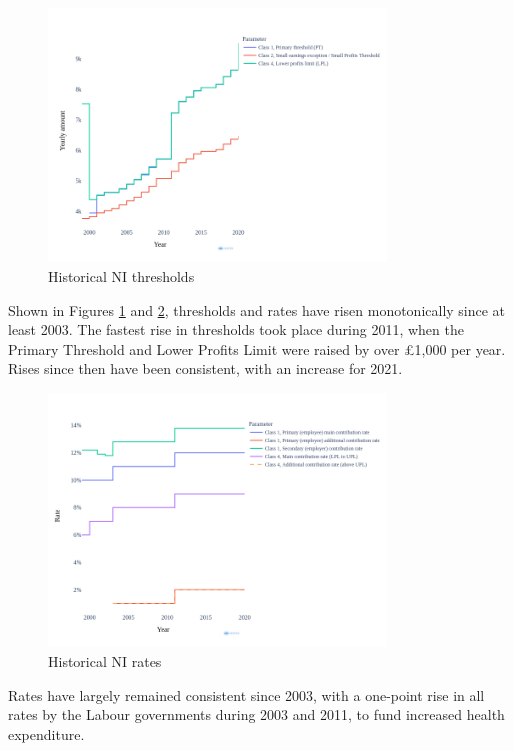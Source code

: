 \documentclass{article}
\begin{document}
    \begin{figure}
        \centering
        \includegraphics[width=0.8\textwidth]{images/fig_6.png}
        \caption{Historical NI thresholds}
        \label{fig:NI_thresholds}
    \end{figure}

    Shown in Figures \ref{fig:NI_thresholds} and \ref{fig:NI_rates}, thresholds and rates have risen monotonically since at least 2003. The fastest rise in thresholds took place during 2011, when the Primary Threshold and Lower Profits Limit were raised by over £1,000 per year. Rises since then have been consistent, with an increase for 2021.
    
    \begin{figure}
        \centering
        \includegraphics[width=0.8\textwidth]{images/fig_7.png}
        \caption{Historical NI rates}
        \label{fig:NI_rates}
    \end{figure}

    Rates have largely remained consistent since 2003, with a one-point rise in all rates by the Labour governments during 2003 and 2011, to fund increased health expenditure.
\end{document}

